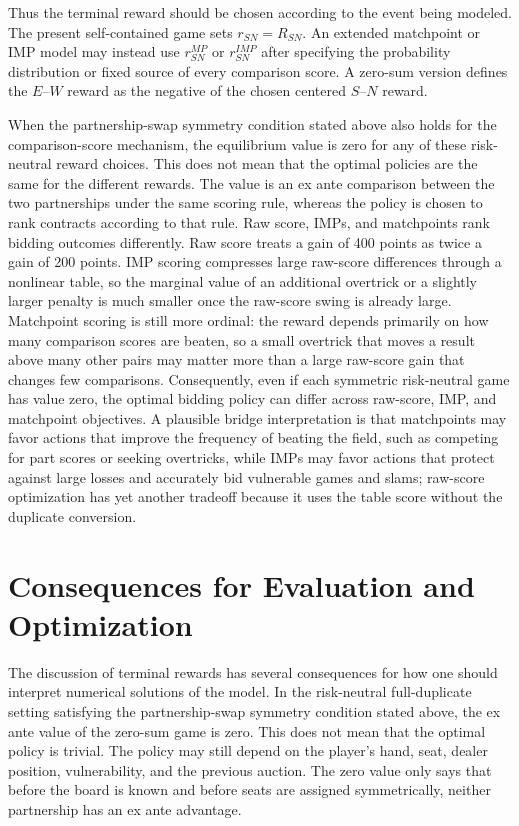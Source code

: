 \documentclass[11pt]{article}
\begin{document}
Thus the terminal reward should be chosen according to the event being modeled. The present self-contained game sets $r_{SN}=R_{SN}$. An extended matchpoint or IMP model may instead use $r_{SN}^{MP}$ or $r_{SN}^{IMP}$ after specifying the probability distribution or fixed source of every comparison score. A zero-sum version defines the $E$--$W$ reward as the negative of the chosen centered $S$--$N$ reward.

When the partnership-swap symmetry condition stated above also holds for the comparison-score mechanism, the equilibrium value is zero for any of these risk-neutral reward choices. This does not mean that the optimal policies are the same for the different rewards. The value is an ex ante comparison between the two partnerships under the same scoring rule, whereas the policy is chosen to rank contracts according to that rule. Raw score, IMPs, and matchpoints rank bidding outcomes differently. Raw score treats a gain of 400 points as twice a gain of 200 points. IMP scoring compresses large raw-score differences through a nonlinear table, so the marginal value of an additional overtrick or a slightly larger penalty is much smaller once the raw-score swing is already large. Matchpoint scoring is still more ordinal: the reward depends primarily on how many comparison scores are beaten, so a small overtrick that moves a result above many other pairs may matter more than a large raw-score gain that changes few comparisons. Consequently, even if each symmetric risk-neutral game has value zero, the optimal bidding policy can differ across raw-score, IMP, and matchpoint objectives. A plausible bridge interpretation is that matchpoints may favor actions that improve the frequency of beating the field, such as competing for part scores or seeking overtricks, while IMPs may favor actions that protect against large losses and accurately bid vulnerable games and slams; raw-score optimization has yet another tradeoff because it uses the table score without the duplicate conversion.


\section{Consequences for Evaluation and Optimization}

The discussion of terminal rewards has several consequences for how one should interpret numerical solutions of the model. In the risk-neutral full-duplicate setting satisfying the partnership-swap symmetry condition stated above, the ex ante value of the zero-sum game is zero. This does not mean that the optimal policy is trivial. The policy may still depend on the player's hand, seat, dealer position, vulnerability, and the previous auction. The zero value only says that before the board is known and before seats are assigned symmetrically, neither partnership has an ex ante advantage.
\end{document}
